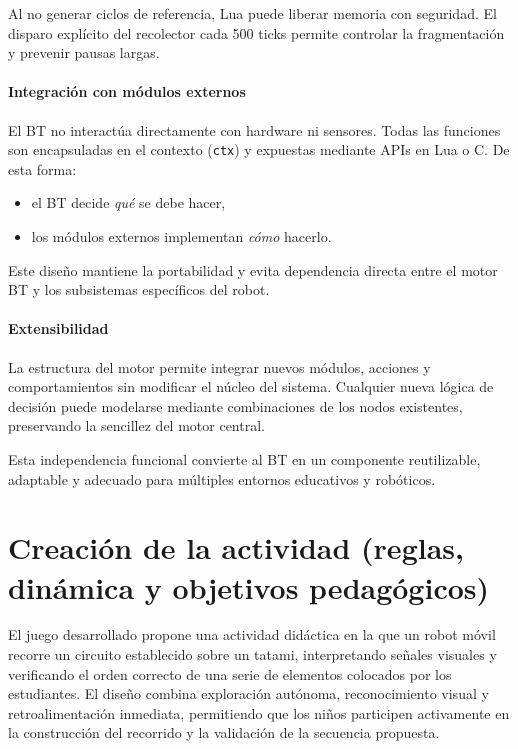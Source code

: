 \documentclass{prgrado}
\begin{document}
Al no generar ciclos de referencia, Lua puede liberar memoria con seguridad. El disparo explícito del recolector cada 500 ticks permite controlar la fragmentación y prevenir pausas largas.

\subsubsection{Integración con módulos externos}

El BT no interactúa directamente con hardware ni sensores. Todas las funciones son encapsuladas en el contexto (\texttt{ctx}) y expuestas mediante APIs en Lua o C. De esta forma:

\begin{itemize}
    \item el BT decide \emph{qué} se debe hacer,
    \item los módulos externos implementan \emph{cómo} hacerlo.
\end{itemize}

Este diseño mantiene la portabilidad y evita dependencia directa entre el motor BT y los subsistemas específicos del robot.

\subsubsection{Extensibilidad}

La estructura del motor permite integrar nuevos módulos, acciones y comportamientos sin modificar el núcleo del sistema. Cualquier nueva lógica de decisión puede modelarse mediante combinaciones de los nodos existentes, preservando la sencillez del motor central.

Esta independencia funcional convierte al BT en un componente reutilizable, adaptable y adecuado para múltiples entornos educativos y robóticos.


\chapter{Creación de la actividad (reglas, dinámica y objetivos pedagógicos)}

El juego desarrollado propone una actividad didáctica en la que un robot móvil recorre un circuito establecido sobre un tatami, interpretando señales visuales y verificando el orden correcto de una serie de elementos colocados por los estudiantes. El diseño combina exploración autónoma, reconocimiento visual y retroalimentación inmediata, permitiendo que los niños participen activamente en la construcción del recorrido y la validación de la secuencia propuesta.
\end{document}

